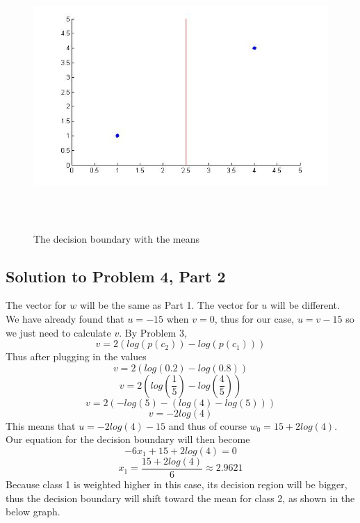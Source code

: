 \documentclass[11pt,psfig]{article}
\begin{document}
\begin{figure}[H]
\centering
\includegraphics[height=4in]{plot4_part1.jpg}
\caption{The decision boundary with the means}
\end{figure}

\subsection*{Solution to Problem 4, Part 2}

The vector for $w$ will be the same as Part 1. The vector for $u$ will be different. We have already found that $u=-15$ when $v=0$, thus for our case, $u = v-15$ so we just need to calculate $v$. By Problem 3, 
\[
v = 2(log(p(c_2)) - log(p(c_1)))
\]
Thus after plugging in the values
\[
v = 2( log(0.2) - log(0.8) )
\]
\[
v = 2 ( log(\frac{1}{5}) - log(\frac{4}{5}) )
\]
\[
v = 2 ( -log(5) - ( log(4) - log(5) ) )
\]
\[
v = -2 log(4)
\]
This means that $u = -2log(4)-15$ and thus of course $w_0 = 15+2log(4)$. Our equation for the decision boundary will then become
\[
-6 x_1 + 15 + 2log(4) = 0
\]
\[
x_1 = \frac{15+2log(4)}{6} \approx 2.9621
\]
Because class 1 is weighted higher in this case, its decision region will be bigger, thus the decision boundary will shift toward the mean for class 2, as shown in the below graph. 
\end{document}
